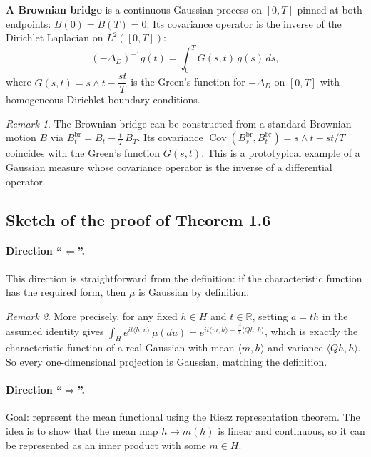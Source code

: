 \documentclass[11pt]{article}
\theoremstyle{definition}
\theoremstyle{remark}
\newtheorem{remark}{Remark}
\begin{document}
\textbf{A Brownian bridge} is a continuous Gaussian process on $[0,T]$ pinned at both endpoints: $B(0) = B(T) = 0$. Its covariance operator is the inverse of the Dirichlet Laplacian on $L^2([0,T])$:
\[
    (-\Delta_D)^{-1} g(t)
    = \int_0^{T} G(s,t)\, g(s)\,ds,
\]
where $G(s,t) = s \wedge t - \dfrac{st}{T}$ is the Green's function for $-\Delta_D$ on $[0,T]$ with homogeneous Dirichlet boundary conditions.

\begin{remark}
The Brownian bridge can be constructed from a standard Brownian motion $B$ via $B^{\mathrm{br}}_t = B_t - \frac{t}{T}\,B_T$.  Its covariance $\operatorname{Cov}(B^{\mathrm{br}}_s, B^{\mathrm{br}}_t) = s \wedge t - st/T$ coincides with the Green's function $G(s,t)$.  This is a prototypical example of a Gaussian measure whose covariance operator is the inverse of a differential operator.
\end{remark}

\subsection*{Sketch of the proof of Theorem 1.6}

\paragraph{Direction ``$\Leftarrow$''.}
This direction is straightforward from the definition: if the characteristic function has the required form, then $\mu$ is Gaussian by definition.

\begin{remark}
More precisely, for any fixed $h \in H$ and $t \in \mathbb{R}$, setting $a = th$ in the assumed identity gives
$\int_H e^{it\langle h, u\rangle}\,\mu(du) = e^{it\langle m, h\rangle - \frac{t^2}{2}\langle Qh, h\rangle}$,
which is exactly the characteristic function of a real Gaussian with mean $\langle m, h\rangle$ and variance $\langle Qh, h\rangle$.  So every one-dimensional projection is Gaussian, matching the definition.
\end{remark}

\paragraph{Direction ``$\Rightarrow$''.}
Goal: represent the mean functional using the Riesz representation theorem. The idea is to show that the mean map $h \mapsto m(h)$ is linear and continuous, so it can be represented as an inner product with some $m \in H$.
\end{document}
